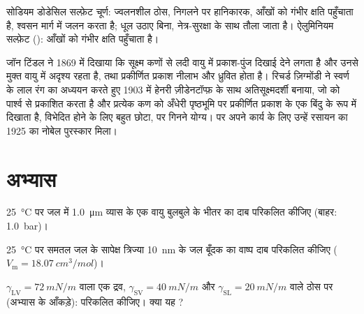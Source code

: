 \begin{safety}{}
सोडियम डोडेसिल सल्फ़ेट चूर्ण: ज्वलनशील ठोस, निगलने पर हानिकारक, आँखों को
गंभीर क्षति पहुँचाता है, श्वसन मार्ग में जलन करता है; धूल उठाए बिना,
नेत्र-सुरक्षा के साथ तौला जाता है। ऐलुमिनियम सल्फ़ेट (): आँखों को गंभीर
क्षति पहुँचाता है।
\end{safety}

\begin{history}[टिंडल और अतिसूक्ष्मदर्शी]
जॉन टिंडल ने 1869 में दिखाया कि सूक्ष्म कणों से लदी वायु में प्रकाश-पुंज
दिखाई देने लगता है और उनसे मुक्त वायु में अदृश्य रहता है, तथा प्रकीर्णित
प्रकाश नीलाभ और ध्रुवित होता है। रिचर्ड ज़िग्मोंडी ने स्वर्ण  के लाल रंग
का अध्ययन करते हुए 1903 में हेनरी ज़ीडेनटॉप्फ़ के साथ अतिसूक्ष्मदर्शी बनाया, जो
 को पार्श्व से प्रकाशित करता है और प्रत्येक कण को अँधेरी पृष्ठभूमि पर
प्रकीर्णित प्रकाश के एक बिंदु के रूप में दिखाता है, विभेदित होने के लिए बहुत छोटा, पर गिनने योग्य।
 पर अपने कार्य के लिए उन्हें रसायन का 1925 का नोबेल पुरस्कार मिला।
\end{history}

\section{अभ्यास}

\begin{exercise}[$\star$]\label{exo:b3:colloids:1}
\qty{25}{\celsius} पर जल में \qty{1.0}{\micro m} व्यास के एक वायु बुलबुले के भीतर का दाब
परिकलित कीजिए (बाहर: \qty{1.0}{bar})।
\end{exercise}

\begin{exercise}[$\star$]\label{exo:b3:colloids:2}
\qty{25}{\celsius} पर समतल जल के सापेक्ष त्रिज्या \qty{10}{nm} के जल बूँदक का वाष्प दाब
परिकलित कीजिए ($V_{\mathrm m} = \qty{18.07}{cm^3/mol}$)।
\end{exercise}

\begin{exercise}[$\star$]\label{exo:b3:colloids:3}
$\gamma_{\mathrm{LV}} = \qty{72}{mN/m}$ वाला एक द्रव, $\gamma_{\mathrm{SV}} = \qty{40}{mN/m}$ और $\gamma_{\mathrm{SL}} =
\qty{20}{mN/m}$ वाले ठोस पर (अभ्यास के आँकड़े):  परिकलित कीजिए। क्या यह ?
\end{exercise}


